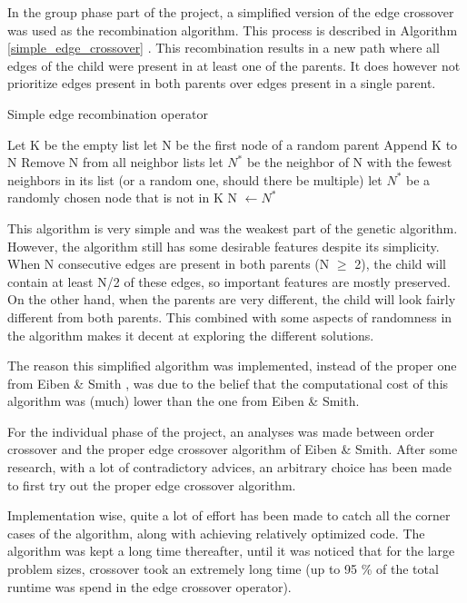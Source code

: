 \documentclass[a4paper,10pt]{article}
\begin{document}
In the group phase part of the project, a simplified version of the edge crossover was used as the recombination algorithm. This process is described in Algorithm \ref{simple_edge_crossover} \cite{initial_implementation_edge_crossover}. This recombination results in a new path where all edges of the child were present in at least one of the parents. It does however not prioritize edges present in both parents over edges present in a single parent.

\begin{algorithm}
\caption{Simple edge recombination operator}\label{simple_edge_crossover}
\begin{algorithmic}
\State Let K be the empty list
\State let N be the first node of a random parent
\State Append K to N
\State Remove N from all neighbor lists
\State let $N^*$ be the neighbor of N with the fewest neighbors in its list (or a random one, should there be multiple)
\Else 
\State let $N^*$ be a randomly chosen node that is not in K
\EndIf
\EndWhile
\State N $\gets N^*$
\end{algorithmic}
\end{algorithm}

This algorithm is very simple and was the weakest part of the genetic algorithm. However, the algorithm still has some desirable features despite its simplicity. When N consecutive edges are present in both parents (N $ \ge $ 2), the child will contain at least N/2 of these edges, so important features are mostly preserved. On the other hand,
when the parents are very different, the child will look fairly different from both parents. This combined with some aspects of randomness in the algorithm makes it decent at exploring the different solutions. 

The reason this simplified algorithm was implemented, instead of the proper one from Eiben \& Smith \cite{eiben_smith}, was due to the belief that the computational cost of this algorithm was (much) lower than the one from Eiben \& Smith. 

For the individual phase of the project, an analyses was made between order crossover and the proper edge crossover algorithm of Eiben \& Smith. After some research, with a lot of contradictory advices, an arbitrary choice has been made to first try out the proper edge crossover algorithm.

Implementation wise, quite a lot of effort has been made to catch all the corner cases of the algorithm, along with achieving relatively optimized code. The algorithm was kept a long time thereafter, until it was noticed that for the large problem sizes, crossover took an extremely long time (up to 95 \% of the total runtime was spend in the edge crossover operator).
\end{document}
